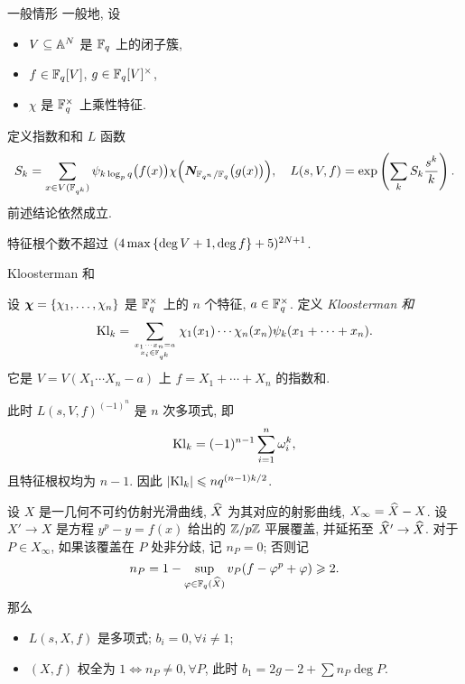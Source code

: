 \documentclass[aspectratio=169,handout]{ctexbeamer}
\newcommand\bchi{{\boldsymbol\chi}}
\begin{document}
\begin{frame}{一般情形}
一般地, 设
\begin{itemize}
\item $V\subseteq {\mathbb{A}}^N$ 是 ${\mathbb{F}}_q$ 上的闭子簇,
\item $f\in {\mathbb{F}}_q[V]$, $g\in{\mathbb{F}}_q[V]^\times$,
\item $\chi$ 是 ${\mathbb{F}}_q^\times$ 上乘性特征.
\end{itemize}
定义指数和和 $L$ 函数
	\[S_k=\sum_{x\in V({\mathbb{F}}_{q^k})}\psi_{k\log_p q}\bigl(f(x)\bigr)\chi\Bigl({\boldsymbol{N}}_{{\mathbb{F}}_{q^n}/{\mathbb{F}}_q}\bigl(g(x)\bigr)\Bigr),\quad
	L(s,V,f)=\exp\left(\sum_k S_k\frac{s^k}k\right).\]
前述结论依然成立.
\begin{theorem}[Bombieri1978]
特征根个数不超过 $(4\max{\left\{\deg V+1,\deg f\right\}}+5)^{2N+1}$.
\end{theorem}
\end{frame}


\begin{frame}{Kloosterman 和}

\begin{example}
设 $\bchi=\set{\chi_1,\dots,\chi_n}$ 是 ${\mathbb{F}}_q^\times$ 上的 $n$ 个特征, $a\in{\mathbb{F}}_q^\times$.
定义 \emph{Kloosterman 和}
	\[{\mathrm{Kl}}_k=\sum_{x_1\cdots x_n=a\atop x_i\in{\mathbb{F}}_{q^k}}\chi_1(x_1)\cdots\chi_n(x_n)\psi_k(x_1+\cdots+x_n).\]
它是 $V=V(X_1\cdots X_n-a)$ 上 $f=X_1+\cdots+X_n$ 的指数和.

此时 $L(s,V,f)^{(-1)^n}$ 是 $n$ 次多项式, 即
\[{\mathrm{Kl}}_k=(-1)^{n-1}\sum_{i=1}^n \omega_i^k,\]
且特征根权均为 $n-1$.
因此 $|{\mathrm{Kl}}_k|\leqslant nq^{(n-1)k/2}$.
\end{example}
\end{frame}


\begin{frame}
\begin{example}[Serre1977]
设 $X$ 是一几何不可约仿射光滑曲线, $\widehat X$ 为其对应的射影曲线, $X_\infty=\widehat X-X$.
设 $X'\to X$ 是方程 $y^p-y=f(x)$ 给出的 ${\mathbb{Z}}/p{\mathbb{Z}}$ 平展覆盖, 并延拓至 $\widehat X'\to \widehat X$.
对于 $P\in X_\infty$, 如果该覆盖在 $P$ 处非分歧, 记 $n_P=0$; 否则记
\[n_P=1-\sup_{\varphi\in{\mathbb{F}}_q(\widehat X)} v_P(f-\varphi^p+\varphi)\geqslant 2.\]
那么
\begin{itemize}
	\item $L(s,X,f)$ 是多项式; $b_i=0, \forall i\neq 1$;
	\item $(X,f)$ 权全为 $1 \iff n_P\neq 0,\forall P$, 此时 $b_1=2g-2+\sum n_P\deg P$.
\end{itemize}
\end{example}
\end{frame}
	
\end{document}
